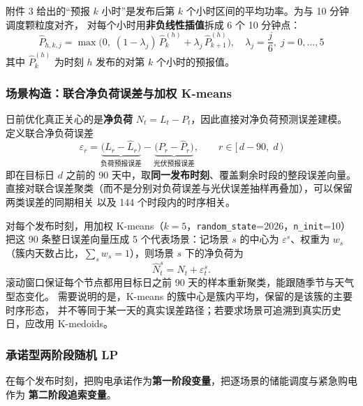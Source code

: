 \documentclass[12pt,a4paper]{article}
\begin{document}
附件 3 给出的“预报 $k$ 小时”是发布后第 $k$ 个小时区间的平均功率。为与 10 分钟调度颗粒度对齐，
对每个小时用\textbf{非负线性插值}拆成 6 个 10 分钟点：
\begin{equation}
    \hat{P}_{h,k,j} = \max\Big(0,\;
        (1-\lambda_j)\,\hat{P}^{(h)}_{k} + \lambda_j\,\hat{P}^{(h)}_{k+1}\Big),
        \quad \lambda_j = \frac{j}{6},\; j = 0, \ldots, 5
    \label{eq:q3_downscale}
\end{equation}
其中 $\hat{P}^{(h)}_{k}$ 为时刻 $h$ 发布的对第 $k$ 个小时的预报值。

\subsubsection{场景构造：联合净负荷误差与加权 K-means}

日前优化真正关心的是\textbf{净负荷} $N_t = L_t - P_t$，因此直接对净负荷预测误差建模。
定义联合净负荷误差
\begin{equation}
    \varepsilon_r = \underbrace{\big(L_r - \hat{L}_r\big)}_{\text{负荷预报误差}}
                 - \underbrace{\big(P_r - \hat{P}_r\big)}_{\text{光伏预报误差}},
    \qquad r \in [\,d - 90,\; d\,)
    \label{eq:q3_eps}
\end{equation}
即在目标日 $d$ 之前的 90 天中，取\textbf{同一发布时刻}、覆盖剩余时段的整段误差向量。
直接对联合误差聚类（而不是分别对负荷误差与光伏误差抽样再叠加），可以保留两类误差的同期相关
以及 144 个时段内的时序相关。

对每个发布时刻，用加权 K-means（$k=5$，\texttt{random\_state}=2026，\texttt{n\_init}=10）
把这 90 条整日误差向量压成 5 个代表场景：记场景 $s$ 的中心为 $\varepsilon^{s}$、权重为 $w_s$
（簇内天数占比，$\sum_s w_s = 1$），则场景 $s$ 下的净负荷为
\begin{equation}
    \hat{N}^{s}_{t} = \hat{N}_{t} + \varepsilon^{s}_{t}.
    \label{eq:q3_scenario}
\end{equation}
滚动窗口保证每个节点都用目标日之前 90 天的样本重新聚类，能跟随季节与天气型态变化。
需要说明的是，K-means 的簇中心是簇内平均，保留的是该簇的主要时序形态，
并不等同于某一天的真实误差路径；若要求场景可追溯到真实历史日，应改用 K-medoids。

\subsubsection{承诺型两阶段随机 LP}

在每个发布时刻，把购电承诺作为\textbf{第一阶段变量}，把逐场景的储能调度与紧急购电作为
\textbf{第二阶段追索变量}。
\end{document}
